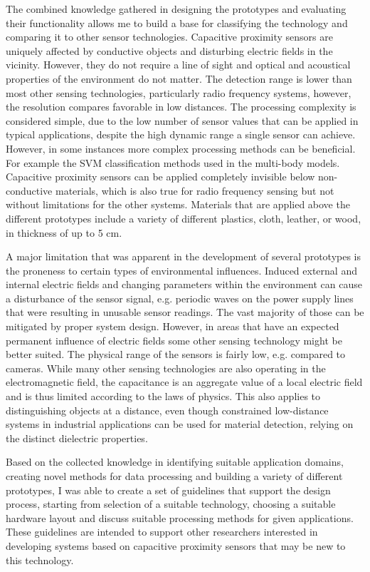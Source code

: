 The combined knowledge gathered in designing the prototypes and evaluating their functionality allows me to build a base for classifying the technology and comparing it to other sensor technologies. Capacitive proximity sensors are uniquely affected by conductive objects and disturbing electric fields in the vicinity. However, they do not require a line of sight and optical and acoustical properties of the environment do not matter. The detection range is lower than most other sensing technologies, particularly radio frequency systems, however, the resolution compares favorable in low distances. The processing complexity is considered simple, due to the low number of sensor values that can be applied in typical applications, despite the high dynamic range a single sensor can achieve. However, in some instances more complex processing methods can be beneficial. For example the SVM classification methods used in the multi-body models. Capacitive proximity sensors can be applied completely invisible below non-conductive materials, which is also true for radio frequency sensing but not without limitations for the other systems. Materials that are applied above the different prototypes include a variety of different plastics, cloth, leather, or wood, in thickness of up to 5 cm.

A major limitation that was apparent in the development of several prototypes is the proneness to certain types of environmental influences. Induced external and internal electric fields and changing parameters within the environment can cause a disturbance of the sensor signal, e.g. periodic waves on the power supply lines that were resulting in unusable sensor readings. The vast majority of those can be mitigated by proper system design. However, in areas that have an expected permanent influence of electric fields some other sensing technology might be better suited. The physical range of the sensors is fairly low, e.g. compared to cameras. While many other sensing technologies are also operating in the electromagnetic field, the capacitance is an aggregate value of a local electric field and is thus limited according to the laws of physics. This also applies to distinguishing objects at a distance, even though constrained low-distance systems in industrial applications can be used for material detection, relying on the distinct dielectric properties. 

Based on the collected knowledge in identifying suitable application domains, creating novel methods for data processing and building a variety of different prototypes, I was able to create a set of guidelines that support the design process, starting from selection of a suitable technology, choosing a suitable hardware layout and discuss suitable processing methods for given applications. These guidelines are intended to support other researchers interested in developing systems based on capacitive proximity sensors that may be new to this technology.

